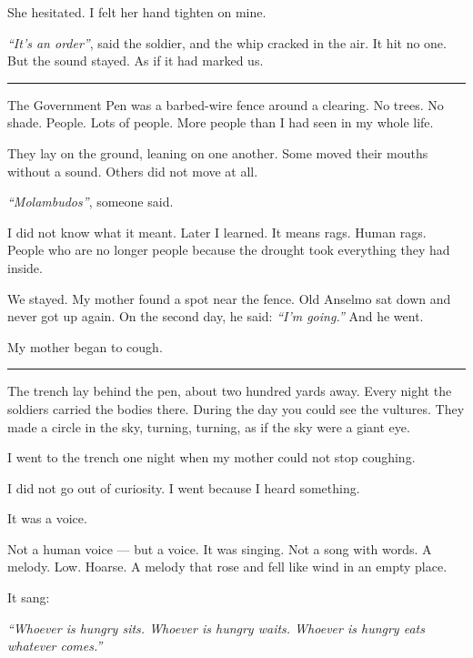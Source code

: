 \noindent She hesitated. I felt her hand tighten on mine.

\noindent \textit{\textquotedblleft{}It's an order\textquotedblright{}}, said the soldier, and the whip cracked in the air. It hit no one. But the sound stayed. As if it had marked us.

\vspace{0.5em}\noindent\rule{\textwidth}{0.5pt}\vspace{0.5em}

\noindent The Government Pen was a barbed-wire fence around a clearing. No trees. No shade. People. Lots of people. More people than I had seen in my whole life.

\noindent They lay on the ground, leaning on one another. Some moved their mouths without a sound. Others did not move at all.

\noindent \textit{\textquotedblleft{}Molambudos\textquotedblright{}}, someone said.

\noindent I did not know what it meant. Later I learned. It means rags. Human rags. People who are no longer people because the drought took everything they had inside.

\noindent We stayed. My mother found a spot near the fence. Old Anselmo sat down and never got up again. On the second day, he said: \textit{\textquotedblleft{}I'm going.\textquotedblright{}} And he went.

\noindent My mother began to cough.

\vspace{0.5em}\noindent\rule{\textwidth}{0.5pt}\vspace{0.5em}

\noindent The trench lay behind the pen, about two hundred yards away. Every night the soldiers carried the bodies there. During the day you could see the vultures. They made a circle in the sky, turning, turning, as if the sky were a giant eye.

\noindent I went to the trench one night when my mother could not stop coughing.

\noindent I did not go out of curiosity.
I went because I heard something.

\noindent It was a voice.

\noindent Not a human voice --- but a voice. It was singing. Not a song with words. A melody. Low. Hoarse. A melody that rose and fell like wind in an empty place.

\noindent It sang:

\noindent \textit{\textquotedblleft{}Whoever is hungry sits. Whoever is hungry waits. Whoever is hungry eats whatever comes.\textquotedblright{}}

